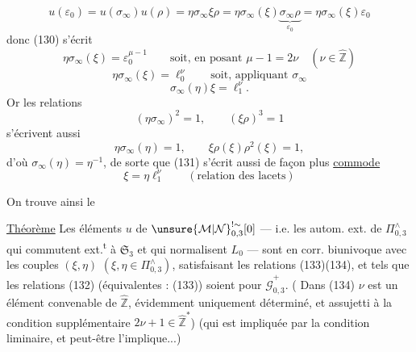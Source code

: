 
 \deleted{$\unsure{\eta\sigma_\infty}$}
\[
u(\varepsilon_0)=u(\sigma_\infty)u(\rho)
=\eta\sigma_\infty\xi\rho
=\eta\sigma_\infty(\xi)\underbrace{\sigma_\infty\rho}_{\varepsilon_0}
=\eta\sigma_\infty(\xi)\varepsilon_0
\]
donc (130) s'écrit
\[
\eta\sigma_\infty(\xi)=\varepsilon_0^{\mu-1}
\qquad\text{soit, en posant }\mu-1=2\nu
\quad(\nu\in\widehat{\mathbb Z})
\]
\[
\eta\sigma_\infty(\xi)=\ell_0^\nu
\qquad\text{soit, appliquant }\sigma_\infty
\]
\[
\tag{131}
\sigma_\infty(\eta)\xi=\ell_1^\nu.
\]
Or les relations
\[
\tag{132}
(\eta\sigma_\infty)^2=1,\qquad(\xi\rho)^3=1
\]
s'écrivent aussi
\[
\tag{133}
\boxed{\eta\sigma_\infty(\eta)=1,\qquad
\xi\rho(\xi)\rho^2(\xi)=1},
\]
d'où $\sigma_\infty(\eta)=\eta^{-1}$, de sorte que (131) s'écrit
aussi de façon plus \uline{commode}
\[
\tag{134}
\boxed{\xi=\eta\ell_1^\nu}
\qquad(\text{relation des lacets})
\]


On trouve ainsi le

\uline{Théorème} Les éléments $u$ de
$\unsure{\mathcal M|\mathcal N}_{0,3}^{!\sim}[0]$ --- i.e. les
autom. ext. de $\Pi_{0,3}^{\wedge}$ qui commutent ext.\textsuperscript{t}
à $\mathfrak S_3$ et qui normalisent $L_0$ --- sont en corr.
biunivoque 
avec les couples $(\xi,\eta)$ $(\xi,\eta\in\Pi_{0,3}^{\wedge})$,
satisfaisant les relations (133)(134), et tels que
les relations (132) (équivalentes : (133)) soient
pour $\widehat{\mathcal G}_{0,3}^{+}$.
( Dans (134) $\nu$ est un élément convenable de
$\widehat{\mathbb Z}$, évidemment uniquement déterminé, et assujetti
à la condition supplémentaire $2\nu+1\in\widehat{\mathbb Z}^{*}$)
(qui est impliquée par la condition liminaire, et peut-être l'implique...)

